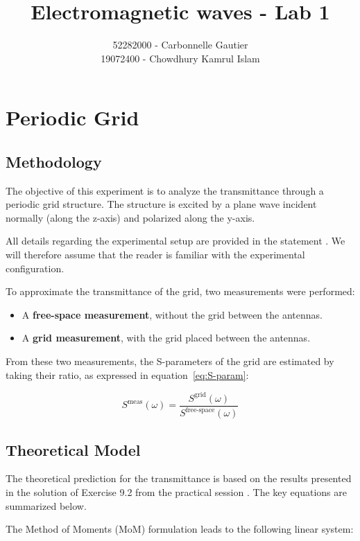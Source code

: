\documentclass{article}
\title{Electromagnetic waves - Lab 1}
\author{52282000 - Carbonnelle Gautier\\
19072400 - Chowdhury Kamrul Islam}
\begin{document}
\maketitle


\section{Periodic Grid}

\subsection{Methodology}

The objective of this experiment is to analyze the transmittance through a periodic grid structure. The structure is excited by a plane wave incident normally (along the z-axis) and polarized along the y-axis.

All details regarding the experimental setup are provided in the statement \cite{statement}. We will therefore assume that the reader is familiar with the experimental configuration.

To approximate the transmittance of the grid, two measurements were performed:
\begin{itemize}
    \item A \textbf{free-space measurement}, without the grid between the antennas.
    \item A \textbf{grid measurement}, with the grid placed between the antennas.
\end{itemize}

From these two measurements, the S-parameters of the grid are estimated by taking their ratio, as expressed in equation~\eqref{eq:S-param}:

\begin{equation}
    \label{eq:S-param}
    S^{\text{meas}}(\omega) = \frac{S^{\text{grid}}(\omega)}{S^{\text{free-space}}(\omega)}
\end{equation}

\subsection{Theoretical Model}

The theoretical prediction for the transmittance is based on the results presented in the solution of Exercise 9.2 from the practical session \cite{ex9}. The key equations are summarized below.

The Method of Moments (MoM) formulation leads to the following linear system:
\end{document}
